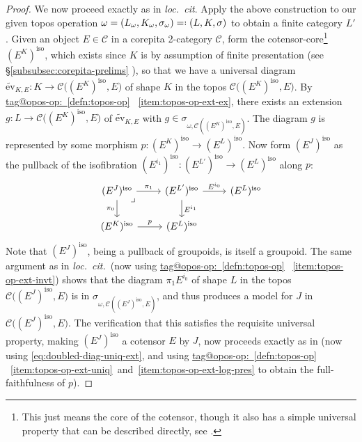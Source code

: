 \documentclass{amsart}
\makeatletter
\newcommand\cC{\mathcal{C}}
\newcommand\ev{\mathrm{ev}}
\newcommand\iso{\mathrm{iso}}
\newcommand\loccitnodot{\textit{loc.~cit}}
\newcommand\loccitspace{\textit{loc.~cit.}\ }
\newcommand\pb[1][rd]{\ar[#1, phantom, "\lrcorner", pos=0]}
\newcommand\pbig[1]{\big({#1}\big)}
\newcommand\qefed{=\mathrel{\vcenter{\baselineskip0.5ex \lineskiplimit0pt \hbox{.}\hbox{.}}}}
\newcommand\wt[1]{\widetilde{#1}}
\newcommand\tagword[1]{\csname tag@#1\endcsname}
\def\label@tag#1:#2\@nil{#1}
\newcommand\labeltag[1]{\label@tag#1:\@nil}
\newcommand\jref[1]{%
  \texorpdfstring%
    {\hyperref[#1]{\tagword{\labeltag{#1}}~\ref*{#1}}}%
    {\tagword{\labeltag{#1}}~\ref*{#1}}%
}
\newcommand\prerefpost[3]{%
  \texorpdfstring%
    {\hyperref[#2]{#1\ref*{#2}#3}}%
    {#1\ref*{#2}#3}%
}
\newcommand\sref[1]{\prerefpost{\S}{#1}{}}
\theoremstyle{definition}
\theoremstyle{remark}
\theoremstyle{plainwithref}
\makeatother
\begin{document}
\begin{proof}
  We now proceed exactly as in \loccitnodot.
  Apply the above construction to our given topos operation \( \omega = (L_\omega, K_\omega, \sigma_\omega) \qefed (L, K, \sigma) \) to obtain a finite category \( L' \).
  Given an object \( E \in \cC \) in a corepita 2-category \( \cC \), form the cotensor-core\footnote{%
    This just means the core of the cotensor, though it also has a simple universal property that can be described directly, see \cite[Remark~3.2.2]{helfer-topoi-in-topoi}.%
}
  \( (E^{K})^\iso \), which exists since \( K \) is by assumption of finite presentation (see \sref{subsubsec:corepita-prelims}), so that we have a universal diagram \( \wt \ev_{K, E} \colon K \to \cC\pbig{(E^{K})^\iso, E} \) of shape \( K \) in the topos \( \cC\pbig{(E^{K})^\iso, E} \).
  By \jref{defn:topos-op}~\ref{item:topos-op-ext-ex}, there exists an extension \( g \colon L \to \cC\pbig{(E^K)^\iso, E} \) of \( \wt \ev_{K, E} \) with \( g \in \sigma_{\omega,\cC((E^{K})^\iso, E)} \).
  The diagram \( g \) is represented by some morphism \( p \colon (E^{K})^\iso \to (E^{L})^\iso \).
  Now form \( (E^J)^\iso \) as the pullback of the isofibration \( (E^{i_1})^\iso \colon (E^{L'})^\iso \to (E^{L})^\iso \) along \( p \):
  \[
    \begin{tikzcd}
      (E^J)^\iso \pb \ar[r, "\pi_1"] \ar[d, "\pi_0"'] & (E^{L'})^\iso \ar[d, "E^{i_1}"] \ar[r, "E^{i_0}"] & (E^L)^\iso \\
      (E^K)^\iso \ar[r, "p"] & (E^L)^\iso
    \end{tikzcd}
  \]
  Note that \( (E^J)^\iso \), being a pullback of groupoids, is itself a groupoid.
  The same argument as in \loccitspace (now using \jref{defn:topos-op}~\ref{item:topos-op-ext-invt}) shows that the diagram \( \pi_1 E^{i_0} \) of shape \( L \) in the topos \( \cC\pbig{(E^J)^\iso, E} \) is in \( \sigma_{\omega,\cC((E^J)^\iso, E)} \), and thus produces a model for \( J \) in \( \cC\pbig{(E^J)^\iso, E} \).
  The verification that this satisfies the requisite universal property, making \( (E^J)^\iso \) a cotensor \( E \) by \( J \), now proceeds exactly as in \cite[Lemma~A.0.2]{helfer-topoi-in-topoi} (now using \eqref{eq:doubled-diag-uniq-ext}, and using \jref{defn:topos-op}~\ref{item:topos-op-ext-uniq}~and~\ref{item:topos-op-ext-log-pres} to obtain the full-faithfulness of \( p \)).
\end{proof}
\end{document}
